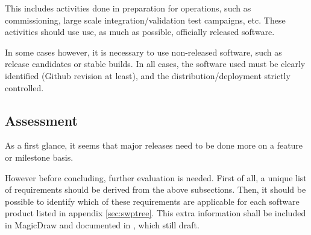 This includes activities done in preparation for operations, such as commissioning, 
large scale integration/validation test campaigns, etc. These activities should use use,  as much as possible,  officially released software.

In some cases however, it is necessary to use non-released software, such as release candidates or stable builds.
In all cases, the software used must be clearly identified (Github revision at least), and the distribution/deployment strictly controlled.


\subsection{Assessment} \label{sec:assessment}

As a first glance, it seems that major releases need to be done more on a feature or milestone basis.

However before concluding, further evaluation is needed.
First of all, a unique list of requirements should be derived from the above subsections. 
Then, it should be possible to identify which of these requirements are applicable for each software product listed in appendix \ref{sec:swptree}.
This extra information shall be included in MagicDraw and documented in , which still draft.


